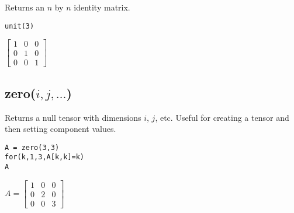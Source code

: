 Returns an $n$ by $n$ identity matrix.

{\color{blue}
\begin{verbatim}
unit(3)
\end{verbatim}
}

\noindent
$\displaystyle
\begin{bmatrix}
1 & 0 & 0\\
0 & 1 & 0\\
0 & 0 & 1
\end{bmatrix}
$

\subsection*{zero($i,j,\ldots$)}

Returns a null tensor with dimensions $i$, $j$, etc.
Useful for creating a tensor and then setting component values.

{\color{blue}
\begin{verbatim}
A = zero(3,3)
for(k,1,3,A[k,k]=k)
A
\end{verbatim}
}

\noindent
$\displaystyle
A=
\begin{bmatrix}
1 & 0 & 0\\
0 & 2 & 0\\
0 & 0 & 3
\end{bmatrix}
$
